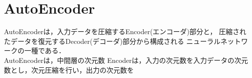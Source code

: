 \section{AutoEncoder}
AutoEncoderは，入力データを圧縮するEncoder(エンコーダ)部分と，
圧縮されたデータを復元するDecoder(デコーダ)部分から構成される
ニューラルネットワークの一種である．\\
AutoEncoderは，中間層の次元数
Encoderは，入力の次元数を入力データの次元数とし，次元圧縮を行い，出力の次元数を

\newpage